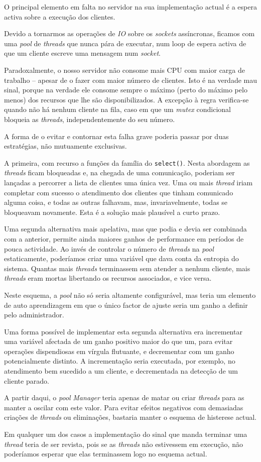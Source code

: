 	\indent\indent O principal elemento em falta no servidor na sua implementação actual é a espera activa sobre a execução dos clientes.
	
	Devido a tornarmos as operações de \emph{IO} sobre os \emph{sockets} assíncronas, ficamos com uma \emph{pool} de \emph{threads} que nunca pára de executar, num loop de espera activa de que um cliente escreve uma mensagem num \emph{\emph{socket}}.
	
	Paradoxalmente, o nosso servidor não consome mais CPU com maior carga de trabalho -- apesar de o fazer com maior número de clientes.
	Isto é na verdade mau sinal, porque na verdade ele consome sempre o máximo (perto do máximo pelo menos) dos recursos que lhe são disponibilizados.
	A excepção à regra verifica-se quando não há nenhum cliente na fila, caso em que um \emph{mutex} condicional bloqueia as \emph{threads}, independentemente do seu número.
	
	A forma de o evitar e contornar esta falha grave poderia passar por duas estratégias, não mutuamente exclusivas.
	
	A primeira, com recurso a funções da família do \verb|select()|.
	Nesta abordagem as \emph{threads} ficam bloqueadas e, na chegada de uma comunicação, poderiam ser lançadas a percorrer a lista de clientes uma única vez.
	Uma ou mais \emph{thread} iriam completar com sucesso o atendimento dos clientes que tinham comunicado alguma coisa, e todas as outras falhavam, mas, invariavelmente, todas se bloqueavam novamente.
	Esta é a solução mais plausível a curto prazo.
	
	Uma segunda alternativa mais apelativa, mas que podia e devia ser combinada com a anterior, permite ainda maiores ganhos de performance em períodos de pouca actividade.
	Ao invés de controlar o número de \emph{threads} na \emph{pool} estaticamente, poderíamos criar uma variável que dava conta da entropia do sistema.
	Quantas mais \emph{threads} terminassem sem atender a nenhum cliente, mais \emph{threads} eram mortas libertando os recursos associados, e vice versa.
		
	Neste esquema, a \emph{pool} não só seria altamente configurável, mas teria um elemento de auto aprendizagem em que o único factor de ajuste seria um ganho a definir pelo administrador.

	Uma forma possível de implementar esta segunda alternativa era incrementar uma variável afectada de um ganho positivo maior do que um, para evitar operações dispendiosas em vírgula flutuante, e decrementar com um ganho potencialmente distinto.
	A incrementação seria executada, por exemplo, no atendimento bem sucedido a um cliente, e decrementada na detecção de um cliente parado.
	
	A partir daqui, o \emph{pool} \emph{Manager} teria apenas de matar ou criar \emph{threads} para as manter a oscilar com este valor.
	Para evitar efeitos negativos com demasiadas criações de \emph{threads} ou eliminações, bastaria manter o esquema de histerese actual.

	Em qualquer um dos casos a implementação do sinal que manda terminar uma \emph{thread} teria de ser revista, pois se as \emph{threads} não estivessem em execução, não poderíamos esperar que elas terminassem logo no esquema actual.


\clearpage
